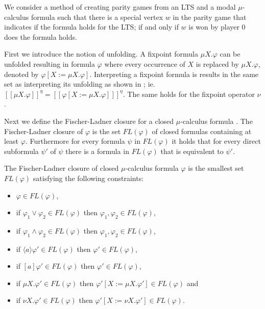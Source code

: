 We consider a method of creating parity games from an LTS and a modal $\mu$-calculus formula such that there is a special vertex $w$ in the parity game that indicates if the formula holds for the LTS; if and only if $w$ is won by player 0 does the formula holds.

First we introduce the notion of unfolding. A fixpoint formula $\mu X . \varphi$ can be unfolded resulting in formula $\varphi$ where every occurrence of $X$ is replaced by $\mu X . \varphi$, denoted by $\varphi [ X:= \mu X . \varphi]$. Interpreting a fixpoint formula is results in the same set as interpreting its unfolding as shown in \cite{Bradfield2018}; ie. $[\![\mu X . \varphi]\!]^\eta = [\![\varphi[X:=\mu X . \varphi]]\!]^\eta$. The same holds for the fixpoint operator $\nu$.

Next we define the Fischer-Ladner closure for a closed $\mu$-calculus formula 
\cite{STREETT1989249,FISCHER1979194}. The Fischer-Ladner closure of $\varphi$ is the set $\textit{FL}(\varphi)$ of closed formulas containing at least $\varphi$. Furthermore for every formula $\psi$ in $\textit{FL}(\varphi)$ it holds that for every direct subformula $\psi'$ of $\psi$ there is a formula in $\textit{FL}(\varphi)$ that is equivalent to $\psi'$.
\begin{definition}
	\label{def_FLClosure}
	The Fischer-Ladner closure of closed $\mu$-calculus formula $\varphi$ is the smallest set $\textit{FL}(\varphi)$ satisfying the following constraints:
	\begin{itemize}
		\item $\varphi \in \textit{FL}(\varphi)$,
		\item if $\varphi_1 \vee \varphi_2 \in \textit{FL}(\varphi)$ then $\varphi_1 ,\varphi_2 \in \textit{FL}(\varphi)$,
		\item if $\varphi_1 \wedge \varphi_2 \in \textit{FL}(\varphi)$ then $\varphi_1 ,\varphi_2 \in \textit{FL}(\varphi)$,
		\item if $\langle a \rangle \varphi' \in \textit{FL}(\varphi)$ then $\varphi' \in \textit{FL}(\varphi)$,
		\item if $[ a ] \varphi' \in \textit{FL}(\varphi)$ then $\varphi' \in \textit{FL}(\varphi)$,
		\item if $\mu X . \varphi' \in \textit{FL}(\varphi)$ then $\varphi'[X:= \mu X . \varphi'] \in \textit{FL}(\varphi)$ and
		\item if $\nu X . \varphi' \in \textit{FL}(\varphi)$ then $\varphi'[X:= \nu X . \varphi'] \in \textit{FL}(\varphi)$.
		
	\end{itemize}
\end{definition}

